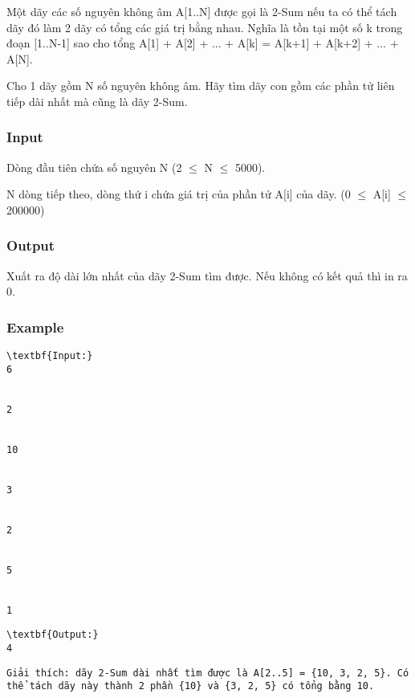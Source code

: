 



   Một dãy các số nguyên không âm A[1..N] được gọi là 2-Sum nếu ta có thể tách dãy đó làm 2 dãy có tổng các giá trị bằng nhau. Nghĩa là tồn tại một số k trong đoạn [1..N-1] sao cho tổng A[1] + A[2] + ... + A[k] = A[k+1] + A[k+2] + ... + A[N].  

   Cho 1 dãy gồm N số nguyên không âm. Hãy tìm dãy con gồm các phần tử liên tiếp dài nhất mà cũng là dãy 2-Sum.  

\subsubsection{   Input  }

   Dòng đầu tiên chứa số nguyên N (2  $\le$  N  $\le$  5000).  

   N dòng tiếp theo, dòng thứ i chứa giá trị của phần tử A[i] của dãy. (0  $\le$  A[i]  $\le$  200000)  

\subsubsection{   Output  }

   Xuất ra độ dài lớn nhất của dãy 2-Sum tìm được. Nếu không có kết quả thì in ra 0.  

\subsubsection{   Example  }
\begin{verbatim}
\textbf{Input:}
6


2


10


3


2


5


1 \end{verbatim}
\begin{verbatim}
\textbf{Output:}
4\end{verbatim}
\begin{verbatim}
Giải thích: dãy 2-Sum dài nhất tìm được là A[2..5] = {10, 3, 2, 5}. Có thể tách dãy này thành 2 phần {10} và {3, 2, 5} có tổng bằng 10.\end{verbatim}
